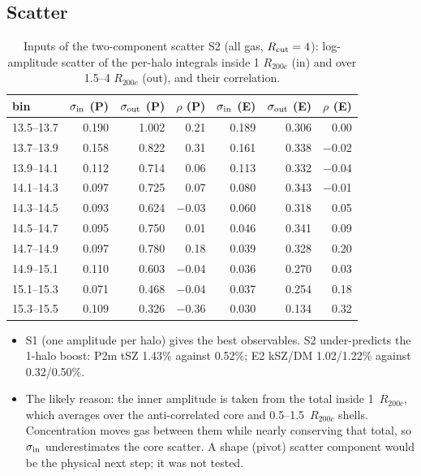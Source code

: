 \documentclass[10pt,a4paper]{article}
\newcommand{\Rc}{R_{200c}}
\begin{document}
\subsection{Scatter}
\begin{table}[H]
\centering
\footnotesize
\caption{Inputs of the two-component scatter S2 (all gas, $R_{\rm cut}=4$): log-amplitude scatter of the per-halo integrals inside 1 $R_{200c}$ (in) and over 1.5--4 $R_{200c}$ (out), and their correlation.}
\label{tab:s2}
\begin{tabular}{lrrrrrr}
\toprule
bin & $\sigma_{\rm in}$ (P) & $\sigma_{\rm out}$ (P) & $\rho$ (P) & $\sigma_{\rm in}$ (E) & $\sigma_{\rm out}$ (E) & $\rho$ (E) \\
\midrule
13.5--13.7 & 0.190 & 1.002 & 0.21 & 0.189 & 0.306 & 0.00 \\
13.7--13.9 & 0.158 & 0.822 & 0.31 & 0.161 & 0.338 & $-$0.02 \\
13.9--14.1 & 0.112 & 0.714 & 0.06 & 0.113 & 0.332 & $-$0.04 \\
14.1--14.3 & 0.097 & 0.725 & 0.07 & 0.080 & 0.343 & $-$0.01 \\
14.3--14.5 & 0.093 & 0.624 & $-$0.03 & 0.060 & 0.318 & 0.05 \\
14.5--14.7 & 0.095 & 0.750 & 0.01 & 0.046 & 0.341 & 0.09 \\
14.7--14.9 & 0.097 & 0.780 & 0.18 & 0.039 & 0.328 & 0.20 \\
14.9--15.1 & 0.110 & 0.603 & $-$0.04 & 0.036 & 0.270 & 0.03 \\
15.1--15.3 & 0.071 & 0.468 & $-$0.04 & 0.037 & 0.254 & 0.18 \\
15.3--15.5 & 0.109 & 0.326 & $-$0.36 & 0.030 & 0.134 & 0.32 \\
\bottomrule
\end{tabular}
\end{table}
\begin{itemize}
\item S1 (one amplitude per halo) gives the best observables. S2 under-predicts the 1-halo boost: P2m tSZ 1.43\% against
  0.52\%; E2 kSZ/DM 1.02/1.22\% against 0.32/0.50\%.
\item The likely reason: the inner amplitude is taken from the total inside 1~$\Rc$, which averages over the anti-correlated
  core and 0.5--1.5~$\Rc$ shells. Concentration moves gas between them while nearly conserving that total, so
  $\sigma_{\rm in}$ underestimates the core scatter. A shape (pivot) scatter component would be the physical next step;
  it was not tested.
\end{itemize}
\end{document}
